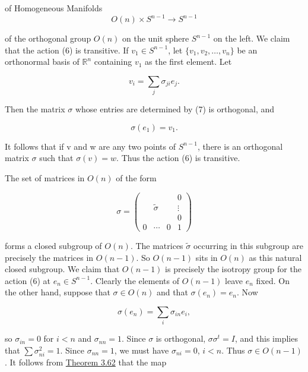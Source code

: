 \begin{examples}{of Homogeneous Manifolds}
\begin{equation}
\tag{6}\label{eq:3.65:6}
O(n)\times S^{n-1}\to S^{n-1}
\end{equation}

of the orthogonal group $O(n)$ on the unit sphere $S^{n-1}$ on the left. We claim that the action (6) is transitive. If $v_1 \in S^{n-1}$, let $\{v_1, v_2, \ldots, v_n\}$ be an orthonormal basis of $\mathbb{R}^n$ containing $v_1$ as the first element. Let

\begin{equation}
\tag{7}\label{eq:3.65:7}
v_{i}=\sum_{j}\sigma_{j i}e_{j}.
\end{equation}

Then the matrix  $ \sigma $ whose entries are determined by (7) is orthogonal, and

\begin{equation}
\tag{8}\label{eq:3.65:8}
\sigma(e_{1})=v_{1}.
\end{equation}

It follows that if v and w are any two points of  $ S^{n-1} $, there is an orthogonal matrix  $ \sigma $ such that  $ \sigma(v) = w $. Thus the action (6) is transitive.

The set of matrices in  $ O(n) $ of the form

\begin{equation}
\tag{9}\label{eq:3.65:9}
\sigma=\begin{pmatrix} & & & 0\\ & \tilde{\sigma} & & \vdots\\ & & & 0\\ 0 & \cdots & 0 & 1\end{pmatrix}
\end{equation}

forms a closed subgroup of $O(n)$. The matrices $\tilde{\sigma}$ occurring in this subgroup are precisely the matrices in $O(n-1)$. So $O(n-1)$ sits in $O(n)$ as this natural closed subgroup. We claim that $O(n-1)$ is precisely the isotropy group for the action (6) at $e_n\in S^{n-1}$. Clearly the elements of $O(n-1)$ leave $e_n$ fixed. On the other hand, suppose that $\sigma\in O(n)$ and that $\sigma(e_n)=e_n$. Now

\[
\sigma(e_{n})=\sum_{i}\sigma_{i n}e_{i},
\]

so  $ \sigma_{in}=0 $ for  $ i<n $ and  $ \sigma_{nn}=1 $. Since  $ \sigma $ is orthogonal,  $ \sigma\sigma^{t}=I $, and this implies that  $ \sum\sigma_{ni}^{2}=1 $. Since  $ \sigma_{nn}=1 $, we must have  $ \sigma_{ni}=0 $,  $ i<n $. Thus  $ \sigma\in O(n-1) $. It follows from \hyperref[thm:3.62]{Theorem 3.62} that the map


\end{examples}
